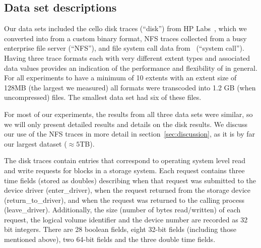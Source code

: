 \subsection{Data set descriptions}

Our data sets included the cello disk traces (``disk'') from HP Labs~\cite{SRT},
which we converted into \DataSeries{} from a custom binary format,
NFS traces collected from 
a busy enterprise file server (``NFS''), and file system call data
from~\cite{Soules05} (``system call''). 
Having three trace formats
each with very different extent types and associated data values provides
an indication of the performance and flexibility of \DataSeries{}
 in general.  For all
experiments to have a minimum of 10 extents with an extent size of
128MB (the largest we measured) all formats were transcoded into 1.2
GB (when uncompressed) files.  The smallest data set had six of these
files. 

For most of our experiments, the results from all three data sets were
similar, so we will only present detailed results and details on the
disk results. 
We discuss our
use of the NFS traces in more detail in section~\ref{sec:discussion}, as 
it is by far our largest dataset ($\approx5$TB).


%

The disk traces contain entries that correspond to operating system
level read and write requests for blocks in a storage system.  Each
request contains three time fields (stored as doubles) describing when that request was
submitted to the device driver (enter\_driver), when the request
returned from the storage device (return\_to\_driver), and when the
request was returned to the calling process (leave\_driver).  
Additionally, the size (number of
bytes read/written) of each request, the logical volume identifier and
the device number are recorded as 32 bit integers. 
There are 28 boolean fields, eight 32-bit fields
 (including those mentioned above), two 64-bit fields and 
the three  double time fields.

